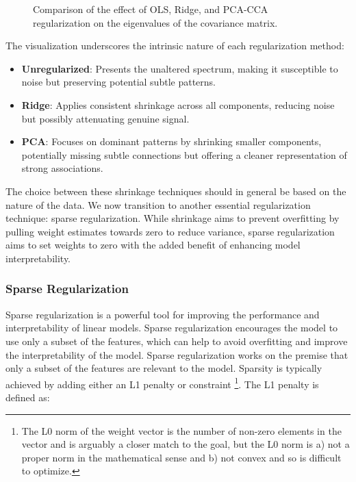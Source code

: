 \begin{figure}
    \centering
    
    \caption{Comparison of the effect of OLS, Ridge, and PCA-CCA regularization on the eigenvalues of the covariance matrix.}
    \label{fig:shrinkage}
\end{figure}

The visualization underscores the intrinsic nature of each regularization method:
\begin{itemize}
    \item \textbf{Unregularized}: Presents the unaltered spectrum, making it susceptible to noise but preserving potential subtle patterns.
    \item \textbf{Ridge}: Applies consistent shrinkage across all components, reducing noise but possibly attenuating genuine signal.
    \item \textbf{PCA}: Focuses on dominant patterns by shrinking smaller components, potentially missing subtle connections but offering a cleaner representation of strong associations.
\end{itemize}
The choice between these shrinkage techniques should in general be based on the nature of the data.
We now transition to another essential regularization technique: sparse regularization.
While shrinkage aims to prevent overfitting by pulling weight estimates towards zero to reduce variance, sparse regularization aims to set weights to zero with the added benefit of enhancing model interpretability.

\subsubsection{Sparse Regularization}

Sparse regularization is a powerful tool for improving the performance and interpretability of linear models.
Sparse regularization encourages the model to use only a subset of the features, which can help to avoid overfitting and improve the interpretability of the model.
Sparse regularization works on the premise that only a subset of the features are relevant to the model.
Sparsity is typically achieved by adding either an L1 penalty or constraint \footnote{The L0 norm of the weight vector is the number of non-zero elements in the vector and is arguably a closer match to the goal, but the L0 norm is a) not a proper norm in the mathematical sense and b) not convex and so is difficult to optimize.}.
The L1 penalty is defined as:

